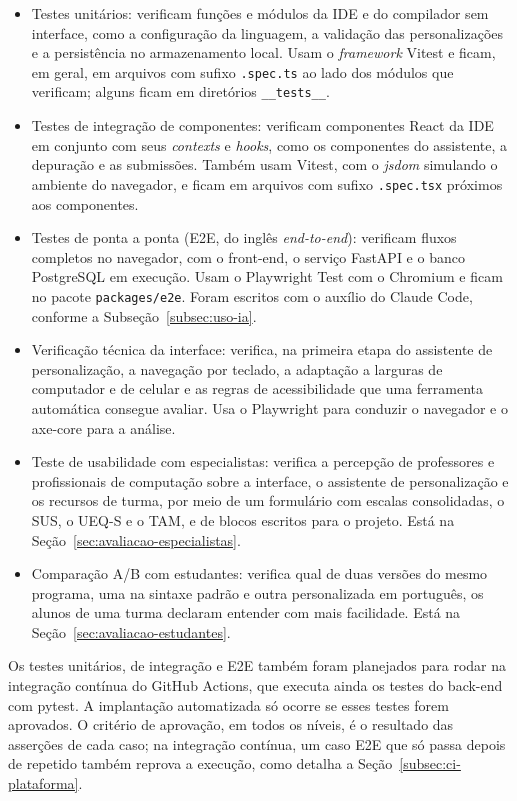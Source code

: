 \begin{itemize}
    \item Testes unitários: verificam funções e módulos da IDE e do compilador sem interface, como a configuração da linguagem, a validação das personalizações e a persistência no armazenamento local. Usam o \textit{framework} Vitest e ficam, em geral, em arquivos com sufixo \texttt{.spec.ts} ao lado dos módulos que verificam; alguns ficam em diretórios \texttt{\_\_tests\_\_}.
    \item Testes de integração de componentes: verificam componentes React da IDE em conjunto com seus \textit{contexts} e \textit{hooks}, como os componentes do assistente, a depuração e as submissões. Também usam Vitest, com o \textit{jsdom} simulando o ambiente do navegador, e ficam em arquivos com sufixo \texttt{.spec.tsx} próximos aos componentes.
    \item Testes de ponta a ponta (E2E, do inglês \textit{end-to-end}): verificam fluxos completos no navegador, com o front-end, o serviço FastAPI e o banco PostgreSQL em execução. Usam o Playwright Test com o Chromium e ficam no pacote \texttt{packages/e2e}. Foram escritos com o auxílio do Claude Code, conforme a Subseção~\ref{subsec:uso-ia}.
    \item Verificação técnica da interface: verifica, na primeira etapa do assistente de personalização, a navegação por teclado, a adaptação a larguras de computador e de celular e as regras de acessibilidade que uma ferramenta automática consegue avaliar. Usa o Playwright para conduzir o navegador e o axe-core para a análise.
    \item Teste de usabilidade com especialistas: verifica a percepção de professores e profissionais de computação sobre a interface, o assistente de personalização e os recursos de turma, por meio de um formulário com escalas consolidadas, o SUS, o UEQ-S e o TAM, e de blocos escritos para o projeto. Está na Seção~\ref{sec:avaliacao-especialistas}.
    \item Comparação A/B com estudantes: verifica qual de duas versões do mesmo programa, uma na sintaxe padrão e outra personalizada em português, os alunos de uma turma declaram entender com mais facilidade. Está na Seção~\ref{sec:avaliacao-estudantes}.
\end{itemize}

Os testes unitários, de integração e E2E também foram planejados para rodar na integração contínua do GitHub Actions, que executa ainda os testes do back-end com pytest. A implantação automatizada só ocorre se esses testes forem aprovados. O critério de aprovação, em todos os níveis, é o resultado das asserções de cada caso; na integração contínua, um caso E2E que só passa depois de repetido também reprova a execução, como detalha a Seção~\ref{subsec:ci-plataforma}.

